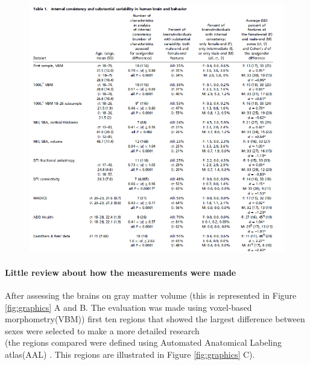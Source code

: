 \documentclass[paper=a4, fontsize=11pt]{scrartcl} %
\numberwithin{equation}{section} %
\numberwithin{figure}{section} %
\numberwithin{table}{section} %
\begin{document}
		\begin{figure}[h!]
			\centering
			\includegraphics[scale=0.82]	{table1.png}
 		
  			\label{fig:table}
  			
		\end{figure}
		
		\newpage
		
		
	\paragraph{Little review about how the measurements were made}
	
		After assessing the brains on gray matter volume (this is represented in Figure \ref{fig:graphics} A and B. The evaluation was made using voxel-based morphometry(VBM))  first ten regions that showed the largest difference between sexes were selected to make a more detailed research \\(the regions compared were defined using Automated Anatomical Labeling atlas(AAL) \cite{AAL}. This regions are illustrated in Figure \ref{fig:graphics} C).		
		
\end{document}

